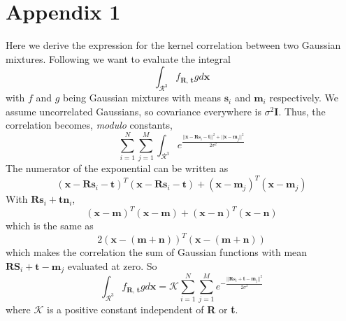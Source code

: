 \documentclass[11pt, a4paper]{article}
\begin{document}
\section*{Appendix 1}
Here we derive the expression for the kernel correlation between two Gaussian mixtures. Following \cite{main} we want to evaluate the integral $$\int_{\mathcal{R}^3} f_{\textbf{R, t}} g d\textbf{x}$$ with $f$ and $g$ being Gaussian mixtures with means $\textbf{s}_i$ and $\textbf{m}_i$ respectively. We assume uncorrelated Gaussians, so covariance everywhere is $\sigma^2 \textbf{I}$. Thus, the correlation becomes, \textit{modulo} constants, $$\sum_{i=1}^{N} \sum_{j=1}^{M} \int_{\mathcal{R}^3} e^{\frac{|| \textbf{x} - \textbf{Rs}_i - \textbf{t} ||^2 + || \textbf{x} - \textbf{m}_j ||^2}{2 \sigma^2}}$$ The numerator of the exponential can be written as $$\left( \textbf{x} - \textbf{Rs}_i - \textbf{t} \right)^T \left( \textbf{x} - \textbf{Rs}_i - \textbf{t} \right) + \left( \textbf{x} - \textbf{m}_j \right)^T \left( \textbf{x} - \textbf{m}_j \right)$$ With $\textbf{Rs}_i + \textbf{t} \textbf{n}_i$,
$$\left( \textbf{x} - \textbf{m} \right)^T \left( \textbf{x} - \textbf{m} \right) + \left( \textbf{x} - \textbf{n} \right)^T \left( \textbf{x} - \textbf{n} \right)$$ which is the same as $$2\left( \textbf{x} - (\textbf{m}+\textbf{n}) \right)^T \left( \textbf{x} - (\textbf{m}+\textbf{n}) \right)$$ which makes the correlation the sum of Gaussian functions with mean $\textbf{RS}_i + \textbf{t} - \textbf{m}_j$ evaluated at zero. So $$\int_{\mathcal{R}^3} f_{\textbf{R, t}} g d\textbf{x} = \mathcal{K} \sum_{i=1}^{N} \sum_{j=1}^{M} e^{-\frac{|| \textbf{Rs}_i + \textbf{t} - \textbf{m}_j ||^2}{2 \sigma^2}}$$ where $\mathcal{K}$ is a positive constant independent of \textbf{R} or \textbf{t}.
\end{document}
